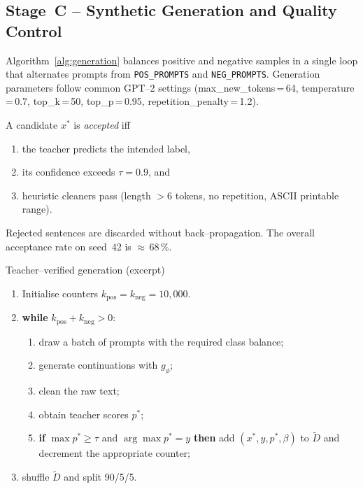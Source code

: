 \documentclass[11pt]{article}
\begin{document}
\subsection{Stage~C -- Synthetic Generation and Quality Control}
\label{sec:generation}

Algorithm~\ref{alg:generation} balances positive and negative samples
in a single loop that alternates prompts from
\verb|POS_PROMPTS| and \verb|NEG_PROMPTS|.
Generation parameters follow common GPT--2 settings
(max\_new\_tokens\,=\,64, temperature\,=\,0.7, top\_k\,=\,50,
top\_p\,=\,0.95, repetition\_penalty\,=\,1.2).

A candidate $x^{\ast}$ is \emph{accepted} iff

\begin{enumerate}
  \item the teacher predicts the intended label,
  \item its confidence exceeds $\tau=0.9$, and
  \item heuristic cleaners pass (length $>6$ tokens, no repetition,
    ASCII printable range).
\end{enumerate}

Rejected sentences are discarded without back--propagation.
The overall acceptance rate on seed~42 is $\approx$\,68\,\%.

\begin{algorithm}[t]
  \small
  \caption{Teacher--verified generation (excerpt)}
  \label{alg:generation}
  \begin{enumerate}
    \item Initialise counters $k_{\mathrm{pos}}=k_{\mathrm{neg}}=10{,}000$.
    \item \textbf{while} $k_{\mathrm{pos}}+k_{\mathrm{neg}}>0$:
      \begin{enumerate}
        \item draw a batch of prompts with the required class balance;
        \item generate continuations with $g_{\phi}$;
        \item clean the raw text;
        \item obtain teacher scores $p^{\ast}$;
        \item \textbf{if} $\max p^{\ast}\ge\tau$ and
          $\arg\max p^{\ast}=y$ \textbf{then}
          add $(x^{\ast},y,p^{\ast},\beta)$ to $\tilde{D}$ and
          decrement the appropriate counter;
      \end{enumerate}
    \item shuffle $\tilde{D}$ and split 90/5/5.
  \end{enumerate}
\end{algorithm}
\end{document}
